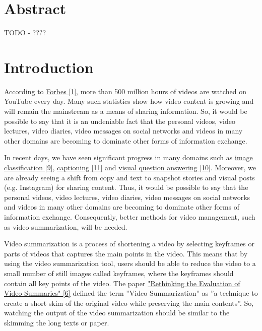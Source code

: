 \documentclass{article}
\begin{document}
\newpage

\section*{Abstract}

TODO - ????

\newpage

\tableofcontents

\newpage

\section{Introduction}

According to \hyperlink{ref1}{Forbes [1]}, more than 500 million hours of videos are watched on YouTube every day. Many such statistics show how video content is growing and will remain the mainstream as a means of sharing information. So, it would be possible to say that it is an undeniable fact that the personal videos, video lectures, video diaries, video messages on social networks and videos in many other domains are becoming to dominate other forms of information exchange.

In recent days, we have seen significant progress in many domains such as \hyperlink{ref9}{image classification [9]}, \hyperlink{ref11}{captioning [11]} and \hyperlink{ref10}{visual question answering [10]}. Moreover, we are already seeing a shift from copy and text to snapshot stories and visual posts (e.g. Instagram) for sharing content. Thus, it would be possible to say that the personal videos, video lectures, video diaries, video messages on social networks and videos in many other domains are becoming to dominate other forms of information exchange. Consequently, better methods for video management, such as video summarization, will be needed. 

Video summarization is a process of shortening a video by selecting keyframes or parts of videos that captures the main points in the video. This means that by using the video summarization tool, users should be able to reduce the video to a small number of still images called keyframes, where the keyframes should contain all key points of the video. The paper \hyperlink{ref6}{"Rethinking the Evaluation of Video Summaries" [6]} defined the term ”Video Summarization” as ”a technique to create a short skim of the original video while preserving the main contents”. So, watching the output of the video summarization should be similar to the skimming the long texts or paper.
\end{document}
